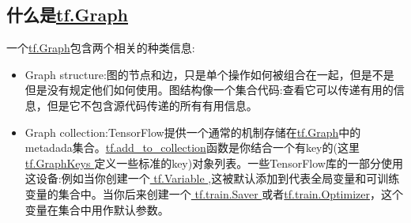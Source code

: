 \subsection{什么是\href{https://www.tensorflow.org/api_docs/python/tf/Graph?hl=zh-cn}{tf.Graph}}
一个\href{https://www.tensorflow.org/api_docs/python/tf/Graph?hl=zh-cn}{tf.Graph}包含两个相关的种类信息:
\begin{itemize}
\item Graph structure:图的节点和边，只是单个操作如何被组合在一起，但是不是但是没有规定他们如何使用。图结构像一个集合代码:查看它可以传递有用的信息，但是它不包含源代码传递的所有有用信息。
\item Graph collection:TensorFlow提供一个通常的机制存储在\href{https://www.tensorflow.org/api_docs/python/tf/Graph?hl=zh-cn}{tf.Graph}中的metadada集合。\href{https://www.tensorflow.org/api_docs/python/tf/add_to_collection?hl=zh-cn}{tf.add\_to\_collection}函数是你结合一个有key的(这里\href{https://www.tensorflow.org/api_docs/python/tf/GraphKeys?hl=zh-cn}{ tf.GraphKeys }定义一些标准的key)对象列表。一些TensorFlow库的一部分使用这设备:例如当你创建一个\href{https://www.tensorflow.org/api_docs/python/tf/Variable?hl=zh-cn}{ tf.Variable },这被默认添加到代表全局变量和可训练变量的集合中。当你后来创建一个\href{https://www.tensorflow.org/api_docs/python/tf/train/Saver?hl=zh-cn}{ tf.train.Saver }或者\href{https://www.tensorflow.org/api_docs/python/tf/train/Optimizer?hl=zh-cn}{tf.train.Optimizer}，这个变量在集合中用作默认参数。
\end{itemize}
